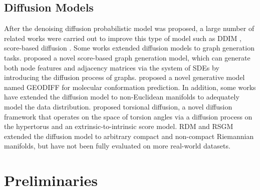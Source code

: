 \documentclass[letterpaper]{article} %
\begin{document}
\subsection{Diffusion Models}
After the denoising diffusion probabilistic model \cite{ho2020denoising} was proposed, a large number of related works were carried out to improve this type of model such as DDIM \cite{DDIM2020}, score-based diffusion \cite{song2020score}.
Some works extended diffusion models to graph generation tasks.
\citet{jo2022score} proposed a novel score-based graph generation model, which can generate both node features and adjacency matrices via the system of SDEs by introducing the diffusion process of graphs.
\citet{GeoDiff2022} proposed a novel generative model named GEODIFF for molecular conformation prediction.
In addition, some works have extended the diffusion model to non-Euclidean manifolds to adequately model the data distribution.
\citet{Torsional2022} proposed torsional diffusion, a novel diffusion framework that operates on the space of torsion angles via a diffusion process on the hypertorus and an extrinsic-to-intrinsic score model.
RDM \cite{huang2022riemannian} and RSGM \cite{de2022riemannian} extended the diffusion model to arbitrary compact and non-compact Riemannian manifolds, but have not been fully evaluated on more real-world datasets.

\section{Preliminaries}
\end{document}
